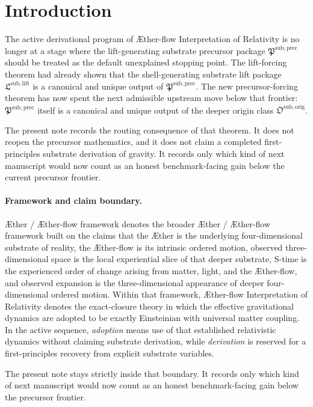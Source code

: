 \documentclass[11pt]{article}
\newcommand{\Aether}{\AE{}ther}
\newcommand{\Aflow}{\AE{}ther-flow}
\newcommand{\TheoryName}{\Aflow{} Interpretation of Relativity}
\newcommand{\TheoryProgram}{\Aether{} / \Aflow{} framework}
\newcommand{\LiftPackage}{\mathfrak L^{\mathrm{sub,lift}}}
\newcommand{\PrecursorPackage}{\mathfrak P^{\mathrm{sub,prec}}}
\newcommand{\OriginPackage}{\mathfrak O^{\mathrm{sub,orig}}}
\begin{document}
\section{Introduction}

The active derivational program of \TheoryName{} is no longer at a stage where the lift-generating substrate precursor package \(\PrecursorPackage\) should be treated as the default unexplained stopping point. The lift-forcing theorem had already shown that the shell-generating substrate lift package \(\LiftPackage\) is a canonical and unique output of \(\PrecursorPackage\). The new precursor-forcing theorem has now spent the next admissible upstream move below that frontier: \(\PrecursorPackage\) itself is a canonical and unique output of the deeper origin class \(\OriginPackage\).

The present note records the routing consequence of that theorem. It does not reopen the precursor mathematics, and it does not claim a completed first-principles substrate derivation of gravity. It records only which kind of next manuscript would now count as an honest benchmark-facing gain below the current precursor frontier.

\paragraph{Framework and claim boundary.}
\TheoryProgram{} denotes the broader \Aether{} / \Aflow{} framework built on the claims that the \Aether{} is the underlying four-dimensional substrate of reality, the \Aflow{} is its intrinsic ordered motion, observed three-dimensional space is the local experiential slice of that deeper substrate, S-time is the experienced order of change arising from matter, light, and the \Aflow{}, and observed expansion is the three-dimensional appearance of deeper four-dimensional ordered motion. Within that framework, \TheoryName{} denotes the exact-closure theory in which the effective gravitational dynamics are adopted to be exactly Einsteinian with universal matter coupling. In the active sequence, \emph{adoption} means use of that established relativistic dynamics without claiming substrate derivation, while \emph{derivation} is reserved for a first-principles recovery from explicit substrate variables.

The present note stays strictly inside that boundary. It records only which kind of next manuscript would now count as an honest benchmark-facing gain below the precursor frontier.
\end{document}
